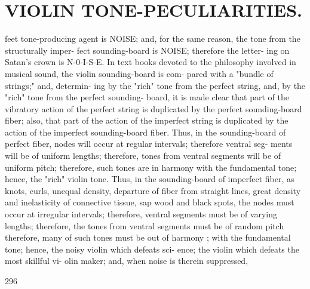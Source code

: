 \documentclass{article}
\begin{document}
\section*{VIOLIN TONE-PECULIARITIES.}
feet tone-producing agent is NOISE; and, for the same reason, the tone from the structurally imper- fect sounding-board is NOISE; therefore the letter- ing on Satan's crown is N-0-I-S-E. In text books devoted to the philosophy involved in musical sound, the violin sounding-board is com- pared with a "bundle of strings;" and, determin- ing by the "rich" tone from the perfect string, and, by the "rich" tone from the perfect sounding- board, it is made clear that part of the vibratory action of the perfect string is duplicated by the perfect sounding-board fiber; also, that part of the action of the imperfect string is duplicated by the action of the imperfect sounding-board fiber. Thus, in the sounding-board of perfect fiber, nodes will occur at regular intervals; therefore ventral seg- ments will be of uniform lengths; therefore, tones from ventral segments will be of uniform pitch; therefore, such tones are in harmony with the fundamental tone; hence, the "rich" violin tone. Thus, in the sounding-board of imperfect fiber, as knots, curls, unequal density, departure of fiber from straight lines, great density and inelasticity of connective tissue, sap wood and black spots, the nodes must occur at irregular intervals; therefore, ventral segments must be of varying lengths; therefore, the tones from ventral segments must be of random pitch therefore, many of such tones must be out of harmony ; with the fundamental tone; hence, the noisy violin which defeats sci- ence; the violin which defeats the most skillful vi- olin maker; and, when noise is therein suppressed,

296
\end{document}
